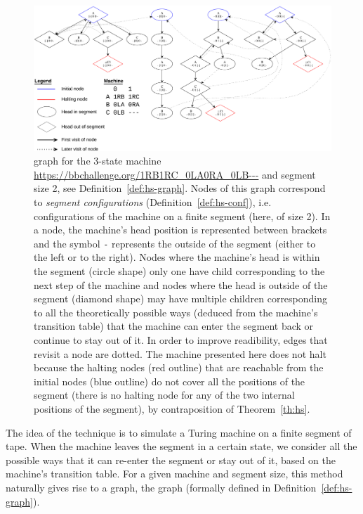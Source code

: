 \begin{figure}[h!]
  \centering
  \includegraphics[width=1\textwidth]{figures/halting-segment/halting-segment.pdf}
  \caption{\HS graph for the 3-state machine \url{https://bbchallenge.org/1RB1RC_0LA0RA_0LB---} and segment size 2, see Definition~\ref{def:hs-graph}. Nodes of this graph correspond to \textit{segment configurations} (Definition~\ref{def:hs-conf}), i.e. configurations of the machine on a finite segment (here, of size 2). In a node, the machine's head position is represented between brackets and the symbol \texttt{-} represents the outside of the segment (either to the left or to the right). Nodes where the machine's head is within the segment (circle shape) only one have child corresponding to the next step of the machine and nodes where the head is outside of the segment (diamond shape) may have multiple children corresponding to all the theoretically possible ways (deduced from the machine's transition table) that the machine can enter the segment back or continue to stay out of it. In order to improve readibility, edges that revisit a node are dotted. The machine presented here does not halt because the halting nodes (red outline) that are reachable from the initial nodes (blue outline) do not cover all the positions of the segment (there is no halting node for any of the two internal positions of the segment), by contraposition of Theorem~\ref{th:hs}. }\label{fig:hs}
\end{figure}

The idea of the \HS technique is to simulate a Turing machine on a finite segment of tape. When the machine leaves the segment in a certain state, we consider all the possible ways that it can re-enter the segment or stay out of it, based on the machine's transition table. For a given machine and segment size, this method naturally gives rise to a graph, the \HS graph (formally defined in Definition~\ref{def:hs-graph}).


